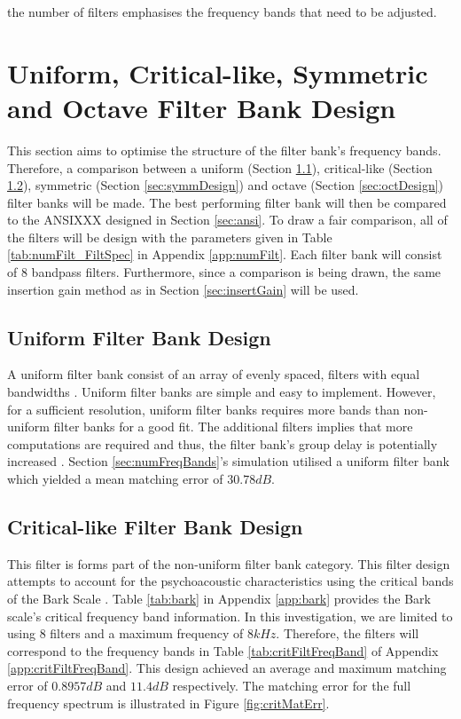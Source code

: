 \documentclass[12pt, onecolumn]{article}
\begin{document}
the number of filters emphasises the frequency bands that need to be adjusted.

\section{Uniform, Critical-like, Symmetric and Octave Filter Bank Design}

\noindent This section aims to optimise the structure of the filter bank's frequency bands. Therefore, a comparison between a uniform (Section \ref{sec:uniDesign}), critical-like (Section \ref{sec:critDesign}), symmetric (Section \ref{sec:symmDesign}) and octave (Section \ref{sec:octDesign}) filter banks will be made. The best performing filter bank will then be compared to the ANSIXXX designed in Section \ref{sec:ansi}. To draw a fair comparison, all of the filters will be design with the parameters given in Table \ref{tab:numFilt_FiltSpec} in Appendix \ref{app:numFilt}. Each filter bank will consist of $8$ bandpass filters. Furthermore, since a comparison is being drawn, the same insertion gain method as in Section \ref{sec:insertGain} will be used.

\subsection{Uniform Filter Bank Design}
\label{sec:uniDesign}

\noindent A uniform filter bank consist of an array of evenly spaced, filters with equal bandwidths \cite{chang}. Uniform filter banks are simple and easy to implement. However, for a sufficient resolution, uniform filter banks requires more bands than non-uniform filter banks for a good fit. The additional filters implies that more computations are required and thus, the filter bank's group delay is potentially increased \cite{brennan}. Section \ref{sec:numFreqBands}'s simulation utilised a uniform filter bank which yielded a mean matching error of $30.78dB$.


\subsection{Critical-like Filter Bank Design}
\label{sec:critDesign}

\noindent This filter is forms part of the non-uniform filter bank category. This filter design attempts to account for the psychoacoustic characteristics using the critical bands of the Bark Scale \cite{chong}. Table \ref{tab:bark} in Appendix \ref{app:bark} provides the Bark scale's critical frequency band information. In this investigation, we are limited to using $8$ filters and a maximum frequency of $8kHz$. Therefore, the filters will correspond to the frequency bands in Table \ref{tab:critFiltFreqBand} of Appendix \ref{app:critFiltFreqBand}.	This design achieved an average and maximum matching error of $0.8957dB$ and $11.4dB$ respectively. The matching error for the full frequency spectrum is illustrated in Figure \ref{fig:critMatErr}.
\end{document}
